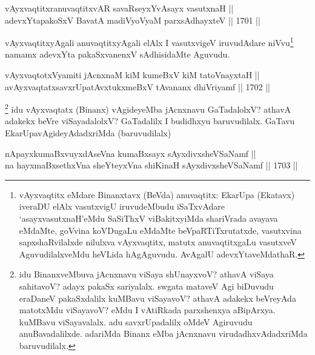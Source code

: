 \begin{shl}
vAyxvaqtitxranuvaqtitxvAR savaRseyxYvAsayx vasutxnaH || \\
adevxYtapakoSxV BavatA madiVyoV\s yaM parxsAdhayxteV \hfill || 1701 ||  
\end{shl}

\begin{artha}
vAyxvaqtitxyAgali anuvaqtitxyAgali elAlx I vasutxvigeV iruvudAdare niVvu\footnote{vAyxvaqtitx eMdare Binanxtavx (BeVda) anuvaqtitx: EkarUpa (Ekatavx) iveraDU elAlx vasutxvigU iruvudeMbudu iSaTxvAdare `asayxvasutxnaH'eMdu SaSiThxV viBakitxyiMda shariVrada avayava eMdaMte, goVvina koVDugaLu eMdaMte beVpaRTiTxrutatxde, vasutxvina sapxshaRvilalxde nilulxva vAyxvaqtitx, matutx anuvaqtitxgaLu vasutxveV AguvudilalxveMdu heVLida hAgAguvudu. AvAgalU adevxYtaveMdathaR.} namamx adevxYta pakaSxvanenxV sAdhisidaMte Aguvudu.
\end{artha}

\begin{shl}
vAyxvaqtotxV\s yamiti jAcnxnaM kiM kumeBxV kiM tatoV\s nayxtaH ||  \\
avAyxvaqtatxsavxrUpatAvxtukxmeBxV tAvananx dhiVriyamf \hfill || 1702 ||  
\end{shl}

\begin{artha}
\footnote{idu BinanxveMbuva jAcnxnavu viSaya shUnayxvoV? athavA viSaya sahitavoV? adayx pakaSx sariyalalx. swgata mataveV Agi biDuvudu eraDaneV pakaSxdalilx kuMBavu viSayavoV? athavA adakekx beVreyAda matotxMdu viSayavoV? eMdu I vAtiRkada parxshenxya aBipArxya. kuMBavu viSayavalalx. adu savxrUpadalilx oMdeV Agiruvudu anuBavadalilxde. adariMda Binanx eMba jAcnxnavu virudadhxvAdadxriMda baruvudilalx.}
idu vAyxvaqtatx (Binanx) vAgideyeMba jAcnxnavu GaTadalolxV? athavA adakekx beVre viSayadalolxV? GaTadalilx I budidhxyu baruvudilalx. GaTavu EkarUpavAgideyAdadxriMda (baruvudilalx)
\end{artha}

\begin{shl}
nApayxkumaBxvuyxdAseVna kumaBxsayx sAyxdivxsheVSaNamf || \\
na hayxmaBxsethxVna sheYteyxVna shiKinaH sAyxdivxsheVSaNamf \hfill || 1703 ||  
\end{shl}

